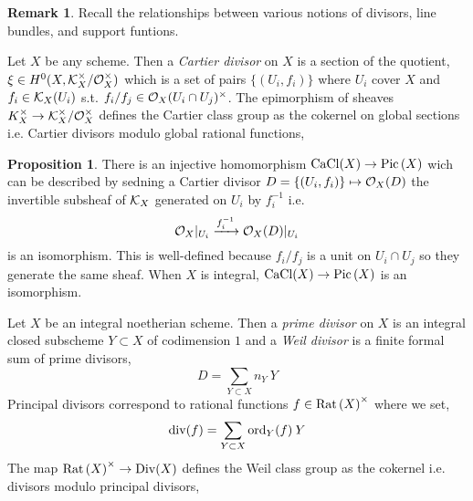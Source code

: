 \documentclass[12pt]{extarticle}
\theoremstyle{definition}
\newtheorem{proposition}[theorem]{Proposition}
\newtheorem{remark}{Remark}
\newenvironment{definition}[1][Definition:]{\begin{trivlist}
\item[\hskip \labelsep {\bfseries #1}]}{\end{trivlist}}
\begin{document}
\begin{remark}
Recall the relationships between various notions of divisors, line bundles, and support funtions.
\end{remark}


\begin{definition}
Let $X$ be any scheme. Then a \textit{Cartier divisor} on $X$ is a section of the quotient, $\xi \in H^0(X, \mathcal{K}_X^\times / \mathcal{O}_{X}^\times)$ which is a set of pairs $\{ (U_i, f_i) \}$ where $U_i$ cover $X$ and $f_i \in \mathcal{K}_X(U_i)$ s.t. $f_i / f_j \in \mathcal{O}_{X}(U_i \cap U_j)^\times$. The epimorphism of sheaves $K_X^\times \to \mathcal{K}_X^\times / \mathcal{O}_{X}^\times$ defines the Cartier class group as the cokernel on global sections i.e. Cartier divisors modulo global rational functions,
\begin{center}
\end{center}
\end{definition}

\begin{proposition}
There is an injective homomorphism $\mathrm{CaCl}{(X)} \to \mathrm{Pic}\left( X \right)$ wich can be described by sedning a Cartier divisor $D = \{ (U_i, f_i) \} \mapsto \mathcal{O}_{X}(D)$ the invertible subsheaf of $\mathcal{K}_X$ generated on $U_i$ by $f_i^{-1}$ i.e.
\[ \mathcal{O}_{X}|_{U_i} \xrightarrow{f_i^{-1}} \mathcal{O}_{X}(D) |_{U_i} \] is an isomorphism. This is well-defined because $f_i / f_j$ is a unit on $U_i \cap U_j$ so they generate the same sheaf. When $X$ is integral, $\mathrm{CaCl}{(X)} \to \mathrm{Pic}\left( X \right)$ is an isomorphism. 
\end{proposition}

\begin{definition}
Let $X$ be an integral noetherian scheme. Then a \textit{prime divisor} on $X$ is an integral closed subscheme $Y \subset X$ of codimension $1$ and a \textit{Weil divisor} is a finite formal sum of prime divisors,
\[ D = \sum_{Y \subset X} n_Y \: Y \]
Principal divisors correspond to rational functions $f \in \mathrm{Rat} \left( X \right)^\times$ where we set,
\[ \mathrm{div}{(f)} = \sum_{Y \subset X} \mathrm{ord}_{Y}(f) \: Y \]
The map $\mathrm{Rat} \left( X \right)^\times \to \mathrm{Div}{(X)}$ defines the Weil class group as the cokernel i.e. divisors modulo principal divisors,
\begin{center}
\end{center}
\end{definition}
\end{document}

